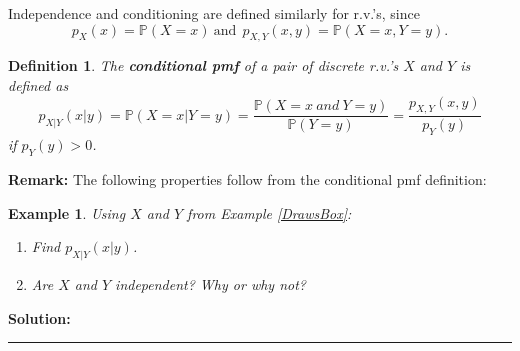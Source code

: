 \documentclass[12pt]{amsart}
\newtheorem{definition}[theorem]{Definition}
\newtheorem{example}[theorem]{Example}
\begin{document}
{\vspace{1cm}

Independence and conditioning are defined similarly for r.v.'s, since%
 $$p_X(x) = \mathbb{P}(X=x)\ \mathrm{and}\ \ p_{X,Y}(x,y) = \mathbb{P}(X = x ,Y = y).$$

\vspace{1cm}
\begin{definition}
The \textbf{conditional pmf} of a pair of discrete r.v.'s $X$ and $Y$ is defined as
$$
p_{X|Y}(x|y) = \mathbb{P}(X = x |Y = y) = \frac{\mathbb{P}(X = x\ and\ Y = y)}{\mathbb{P}(Y = y)}
=\frac{p_{X,Y}(x,y) }{p_{Y}(y) }
$$ 
if $p_{Y}(y)  > 0$.
\end{definition}


\vspace{1cm}



\textbf{Remark:} The following properties follow from the conditional pmf definition:%




\newpage


\begin{example}
Using $X$ and $Y$ from Example \ref{DrawsBox}:
\begin{enumerate}
\item Find $p_{X|Y}(x|y)$.
\item Are $X$ and $Y$ independent? Why or why not?
\end{enumerate}


\end{example}

\textbf{Solution:}


\vspace{18cm}
\hrule
\vspace{.5cm}



}
\end{document}

